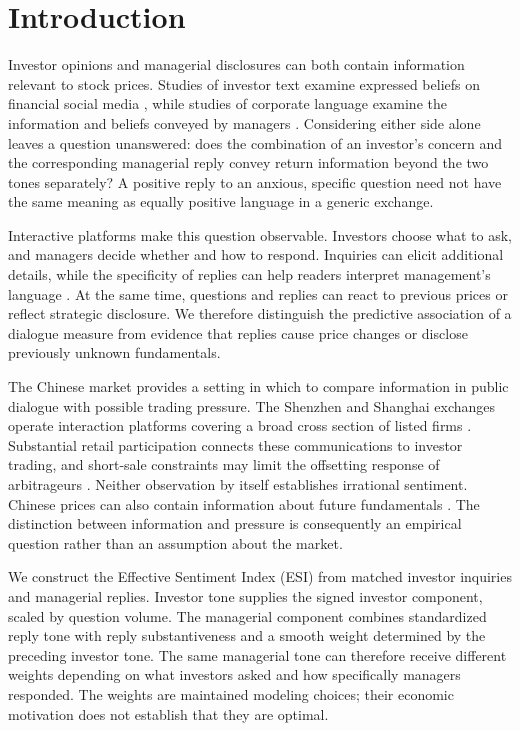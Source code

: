\section{Introduction}\label{sec:introduction}
Investor opinions and managerial disclosures can both contain information relevant to stock prices. Studies of investor text examine expressed beliefs on financial social media \citep{chen2014,bartov2018,cookson2024}, while studies of corporate language examine the information and beliefs conveyed by managers \citep{li2010,jiang2019}. Considering either side alone leaves a question unanswered: does the combination of an investor's concern and the corresponding managerial reply convey return information beyond the two tones separately? A positive reply to an anxious, specific question need not have the same meaning as equally positive language in a generic exchange.

Interactive platforms make this question observable. Investors choose what to ask, and managers decide whether and how to respond. Inquiries can elicit additional details, while the specificity of replies can help readers interpret management's language \citep{hollander2010,matsumoto2011}. At the same time, questions and replies can react to previous prices or reflect strategic disclosure. We therefore distinguish the predictive association of a dialogue measure from evidence that replies cause price changes or disclose previously unknown fundamentals.

The Chinese market provides a setting in which to compare information in public dialogue with possible trading pressure. The Shenzhen and Shanghai exchanges operate interaction platforms covering a broad cross section of listed firms \citep{lee2022shall}. Substantial retail participation connects these communications to investor trading, and short-sale constraints may limit the offsetting response of arbitrageurs \citep{liao2022,jiang2022}. Neither observation by itself establishes irrational sentiment. Chinese prices can also contain information about future fundamentals \citep{carpenter2021}. The distinction between information and pressure is consequently an empirical question rather than an assumption about the market.

We construct the Effective Sentiment Index (ESI) from matched investor inquiries and managerial replies. Investor tone supplies the signed investor component, scaled by question volume. The managerial component combines standardized reply tone with reply substantiveness and a smooth weight determined by the preceding investor tone. The same managerial tone can therefore receive different weights depending on what investors asked and how specifically managers responded. The weights are maintained modeling choices; their economic motivation does not establish that they are optimal.


